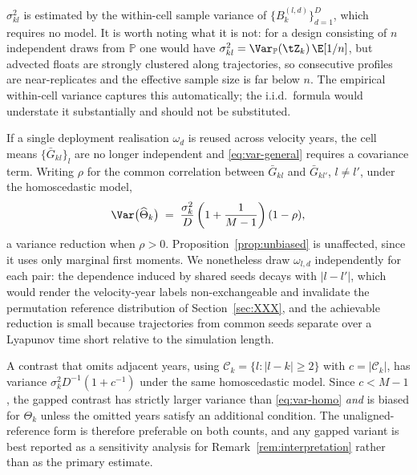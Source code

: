\begin{remark}
\label{rem:sigma}
$\sigma^2_{kl}$ is estimated by the within-cell sample variance of $\{B_k^{(l,d)}\}_{d=1}^{D}$,
which requires no model. It is worth noting what it is not: for a design consisting of $n$
independent draws from $\mathbb{P}$ one would have
$\sigma^2_{kl} = \Var_{\mathbb{P}}(\tZ_k)\,\E[1/n]$, but advected floats are strongly clustered
along trajectories, so consecutive profiles are near-replicates and the effective sample size is
far below $n$. The empirical within-cell variance captures this automatically; the i.i.d.\ formula
would understate it substantially and should not be substituted.
\end{remark}

\begin{remark}
\label{rem:crn}
If a single deployment realisation $\omega_d$ is reused across velocity years, the cell means
$\{\bar{G}_{kl}\}_l$ are no longer independent and \eqref{eq:var-general} requires a covariance
term. Writing $\rho$ for the common correlation between $\bar{G}_{kl}$ and $\bar{G}_{kl'}$,
$l \neq l'$, under the homoscedastic model,
\begin{equation}
  \Var\big(\widehat{\Theta}_k\big)
  \;=\; \frac{\sigma_k^2}{D}\left(1 + \frac{1}{M-1}\right)(1-\rho) ,
\end{equation}
a variance reduction when $\rho > 0$. Proposition~\ref{prop:unbiased} is unaffected, since it uses
only marginal first moments. We nonetheless draw $\omega_{l,d}$ independently for each pair: the
dependence induced by shared seeds decays with $|l - l'|$, which would render the velocity-year
labels non-exchangeable and invalidate the permutation reference distribution of
Section~\ref{sec:XXX}, and the achievable reduction is small because trajectories from common seeds
separate over a Lyapunov time short relative to the simulation length.
\end{remark}

\begin{remark}
\label{rem:gap}
A contrast that omits adjacent years, using $\mathcal{C}_k = \{l : |l-k| \ge 2\}$ with
$c = |\mathcal{C}_k|$, has variance $\sigma_k^2 D^{-1}(1 + c^{-1})$ under the same homoscedastic
model. Since $c < M-1$, the gapped contrast has strictly larger variance than
\eqref{eq:var-homo} \emph{and} is biased for $\Theta_k$ unless the omitted years satisfy an
additional condition. The unaligned-reference form is therefore preferable on both counts, and any
gapped variant is best reported as a sensitivity analysis for Remark~\ref{rem:interpretation}
rather than as the primary estimate.
\end{remark}

